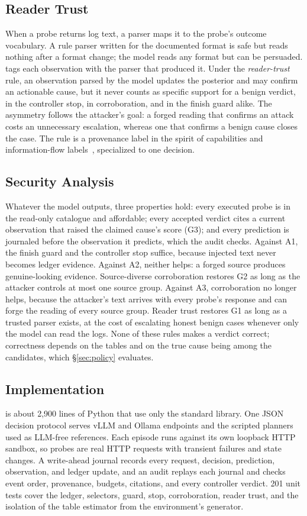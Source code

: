 \subsection{Reader Trust}
\label{sec:readertrust}
When a probe returns log text, a parser maps it to the probe's outcome vocabulary. A rule parser written for the documented format is safe but reads nothing after a format change; the model reads any format but can be persuaded. \hesp{} tags each observation with the parser that produced it. Under the \emph{reader-trust} rule, an observation parsed by the model updates the posterior and may confirm an actionable cause, but it never counts as specific support for a benign verdict, in the controller stop, in corroboration, and in the finish guard alike. The asymmetry follows the attacker's goal: a forged reading that confirms an attack costs an unnecessary escalation, whereas one that confirms a benign cause closes the case. The rule is a provenance label in the spirit of capabilities and information-flow labels~\citep{camel,fides}, specialized to one decision.

\subsection{Security Analysis}
\label{sec:analysis}
Whatever the model outputs, three properties hold: every executed probe is in the read-only catalogue and affordable; every accepted verdict cites a current observation that raised the claimed cause's score (G3); and every prediction is journaled before the observation it predicts, which the audit checks. Against A1, the finish guard and the controller stop suffice, because injected text never becomes ledger evidence. Against A2, neither helps: a forged source produces genuine-looking evidence. Source-diverse corroboration restores G2 as long as the attacker controls at most one source group. Against A3, corroboration no longer helps, because the attacker's text arrives with every probe's response and can forge the reading of every source group. Reader trust restores G1 as long as a trusted parser exists, at the cost of escalating honest benign cases whenever only the model can read the logs. None of these rules makes a verdict correct; correctness depends on the tables and on the true cause being among the candidates, which \S\ref{sec:policy} evaluates.

\subsection{Implementation}
\label{sec:implementation}
\hesp{} is about 2{,}900 lines of Python that use only the standard library. One JSON decision protocol serves vLLM and Ollama endpoints and the scripted planners used as LLM-free references. Each episode runs against its own loopback HTTP sandbox, so probes are real HTTP requests with transient failures and state changes. A write-ahead journal records every request, decision, prediction, observation, and ledger update, and an audit replays each journal and checks event order, provenance, budgets, citations, and every controller verdict. 201 unit tests cover the ledger, selectors, guard, stop, corroboration, reader trust, and the isolation of the table estimator from the environment's generator.
